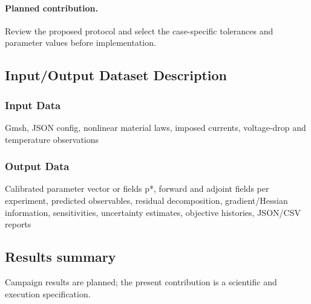 \paragraph{Planned contribution.} Review the proposed protocol and select the case-specific tolerances and parameter values before implementation.

\subsection{Input/Output Dataset Description}

\subsubsection{Input Data}
Gmsh, JSON config, nonlinear material laws, imposed currents, voltage-drop and temperature observations

\subsubsection{Output Data}
Calibrated parameter vector or fields p*, forward and adjoint fields per experiment, predicted observables, residual decomposition, gradient/Hessian information, sensitivities, uncertainty estimates, objective histories, JSON/CSV reports

\subsection{Results summary}
Campaign results are planned; the present contribution is a scientific and execution specification.


